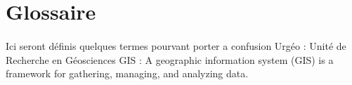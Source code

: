 \section{Glossaire}
\paragraph{}Ici seront définis quelques termes pourvant porter a confusion
Urgéo   : Unité de Recherche en Géosciences
    GIS     : A geographic information system (GIS) is a framework for gathering, managing, and analyzing data.
